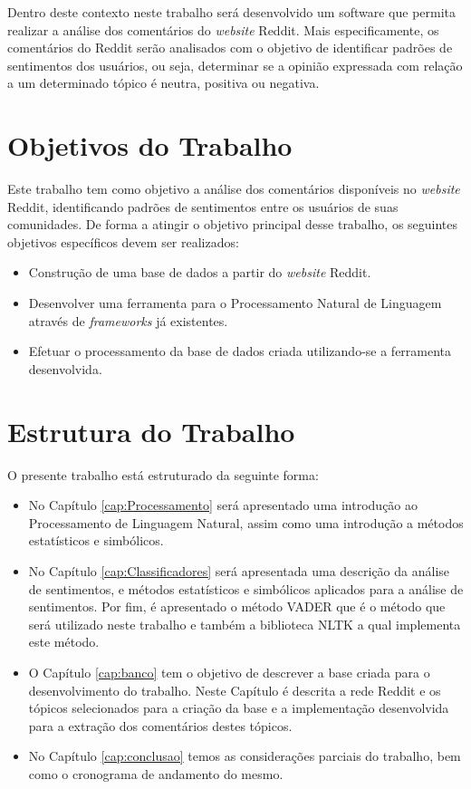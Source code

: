 Dentro deste contexto neste trabalho será desenvolvido um software que permita
realizar a análise dos comentários do \textit{website} Reddit. Mais
especificamente, os comentários do Reddit serão analisados com o objetivo de
identificar padrões de sentimentos dos usuários, ou seja, determinar se a
opinião expressada com relação a um determinado tópico é neutra, positiva ou negativa.

\section{Objetivos do Trabalho}

Este trabalho tem como objetivo a análise dos comentários disponíveis no
\textit{website} Reddit, identificando padrões de sentimentos entre os
usuários de suas comunidades. De forma a atingir o objetivo principal desse
trabalho, os seguintes objetivos específicos devem ser realizados:
\begin{itemize}
  
 \item Construção de uma base de dados a partir do \textit{website} Reddit.
 \item Desenvolver uma ferramenta para o Processamento Natural de Linguagem
 através de \textit{frameworks} já existentes.
 \item Efetuar o processamento da base de dados criada utilizando-se a
 ferramenta desenvolvida.
\end{itemize}

\section{Estrutura do Trabalho}

O presente trabalho está estruturado da seguinte forma: 
\begin{itemize}
  \item No Capítulo \ref{cap:Processamento} será apresentado uma introdução ao
  Processamento de Linguagem Natural, assim como uma introdução a métodos
  estatísticos e simbólicos. 
  \item No Capítulo \ref{cap:Classificadores} será
  apresentada uma descrição da análise de sentimentos, e métodos estatísticos e
  simbólicos aplicados para a análise de sentimentos. Por fim, é apresentado o
  método \ac{VADER} que é o método que será utilizado neste trabalho e também a
  biblioteca \ac{NLTK} a qual implementa este método.
  \item O Capítulo \ref{cap:banco} tem
o objetivo de descrever a base criada para o desenvolvimento do trabalho.
Neste Capítulo é descrita a rede Reddit e os tópicos selecionados para a criação
da base e a implementação desenvolvida para a extração dos comentários destes
tópicos.
\item No Capítulo \ref{cap:conclusao} temos as considerações parciais do
trabalho, bem como o cronograma de andamento do mesmo.
\end{itemize}

